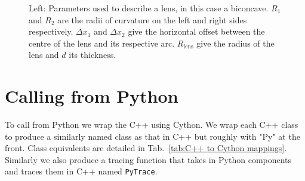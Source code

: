 \documentclass{article}
\begin{document}
\begin{figure}
    \centering

    \caption{Left: Parameters used to describe a lens, in this case a biconcave. $R_1$ and $R_2$ are the radii of curvature on the left and right sides respectively. $\Delta x_1$ and $\Delta x_2$ give the horizontal offset between the centre of the lens and its respective arc. $R_\mathrm{lens}$ give the radius of the lens and $d$ its thickness.}
    \label{fig:convex lens}
\end{figure}


\section{Calling from Python}
To call from Python we wrap the C++ using Cython. We wrap each C++ class to produce a similarly named class as that in C++ but roughly with "Py" at the front. Class equivalents are detailed in Tab.~\ref{tab:C++ to Cython mappings}. Similarly we also produce a tracing function that takes in Python components and traces them in C++ named \texttt{PyTrace}.
\end{document}

